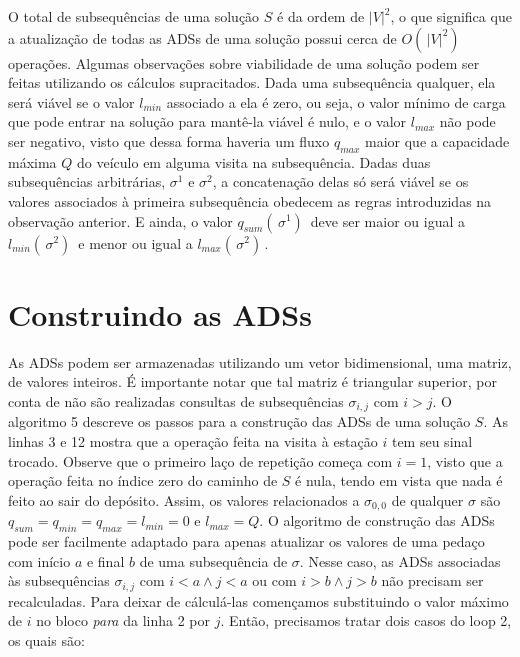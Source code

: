 \par O total de subsequências de uma solução $S$ é da ordem de $|V|^2$, o que significa que a atualização de todas as ADSs de uma solução possui cerca de $O(\,|V|^2)\,$ operações. Algumas observações sobre viabilidade de uma solução podem ser feitas utilizando os cálculos supracitados. Dada uma subsequência qualquer, ela será viável se o valor $l_{min}$ associado a ela é zero, ou seja, o valor mínimo de carga que pode entrar na solução para mantê-la viável é nulo, e o valor $l_{max}$ não pode ser negativo, visto que dessa forma haveria um fluxo $q_{max}$ maior que a capacidade máxima $Q$ do veículo em alguma visita na subsequência. Dadas duas subsequências arbitrárias, $\sigma^1$ e $\sigma^2$, a concatenação delas só será viável se os valores associados à primeira subsequência obedecem as regras introduzidas na observação anterior. E ainda, o valor $q_{sum}(\,\sigma^1)\,$ deve ser maior ou igual a $l_{min}(\,\sigma^2)\,$ e menor ou igual a $l_{max}(\,\sigma^2)\,$.

\section{Construindo as ADSs}\label{sec:LABEL_CHP_4_SEC_B}

\par As ADSs podem ser armazenadas utilizando um vetor bidimensional, uma matriz, de valores inteiros. É importante notar que tal matriz é triangular superior, por conta de não são realizadas consultas de subsequências $\sigma_{i,j}$ com $i > j$. O algoritmo 5 descreve os passos para a construção das ADSs de uma solução $S$. As linhas 3 e 12 mostra que a operação feita na visita à estação $i$ tem seu sinal trocado. Observe que o primeiro laço de repetição começa com $i=1$, visto que a operação feita no índice zero do caminho de $S$ é nula, tendo em vista que nada é feito ao sair do depósito. Assim, os valores relacionados a $\sigma_{0, 0}$ de qualquer $\sigma$ são $q_{sum} = q_{min} = q_{max} = l_{min} = 0$ e $l_{max} = Q$. O algoritmo de construção das ADSs pode ser facilmente adaptado para apenas atualizar os valores de uma pedaço com início $a$ e final $b$ de uma subsequência de $\sigma$. Nesse caso, as ADSs associadas às subsequências $\sigma_{i, j}$ com $i < a \land j < a$ ou com $i > b \land j > b$ não precisam ser recalculadas. Para deixar de cálculá-las començamos substituindo o valor máximo de $i$ no bloco \textit{para} da linha 2 por $j$. Então, precisamos tratar dois casos do loop 2, os quais são:
    

